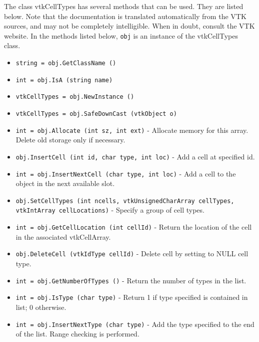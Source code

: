 The class vtkCellTypes has several methods that can be used.
  They are listed below.
Note that the documentation is translated automatically from the VTK sources,
and may not be completely intelligible.  When in doubt, consult the VTK website.
In the methods listed below, \verb|obj| is an instance of the vtkCellTypes class.
\begin{itemize}
\item  \verb|string = obj.GetClassName ()|

\item  \verb|int = obj.IsA (string name)|

\item  \verb|vtkCellTypes = obj.NewInstance ()|

\item  \verb|vtkCellTypes = obj.SafeDownCast (vtkObject o)|

\item  \verb|int = obj.Allocate (int sz, int ext)| -  Allocate memory for this array. Delete old storage only if necessary.

\item  \verb|obj.InsertCell (int id, char type, int loc)| -  Add a cell at specified id.

\item  \verb|int = obj.InsertNextCell (char type, int loc)| -  Add a cell to the object in the next available slot.

\item  \verb|obj.SetCellTypes (int ncells, vtkUnsignedCharArray cellTypes, vtkIntArray cellLocations)| -  Specify a group of cell types.

\item  \verb|int = obj.GetCellLocation (int cellId)| -  Return the location of the cell in the associated vtkCellArray.

\item  \verb|obj.DeleteCell (vtkIdType cellId)| -  Delete cell by setting to NULL cell type.

\item  \verb|int = obj.GetNumberOfTypes ()| -  Return the number of types in the list.

\item  \verb|int = obj.IsType (char type)| -  Return 1 if type specified is contained in list; 0 otherwise.

\item  \verb|int = obj.InsertNextType (char type)| -  Add the type specified to the end of the list. Range checking is performed.


\end{itemize}
